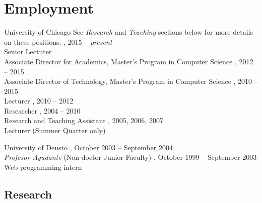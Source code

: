 \documentclass{resume}
\begin{document}
\section*{\hspace{-1cm}Employment}
\begin{category}{University of Chicago}
\citemnobullet{} See \emph{Research} and \emph{Teaching} sections below for more details on these positions.
, 2015 -- \emph{present}\\
Senior Lecturer\\
Associate Director for Academics, Master's Program in Computer Science
, 2012 -- 2015\\
Associate Director of Technology, Master's Program in Computer Science
, 2010 -- 2015\\
Lecturer
, 2010 -- 2012\\
Researcher
, 2004 -- 2010\\
Research and Teaching Assistant
, 2005, 2006, 2007\\
Lecturer (Summer Quarter only)
\end{category}
\begin{category}{University of Deusto}
, October 2003 -- September 2004\\
\emph{Profesor Ayudante} (Non-doctor Junior Faculty)
, October 1999 -- September 2003\\
Web programming intern
\end{category}

\pagebreak





\begin{center}
\section*{\huge Research}
\vspace{2ex}
\end{center}
\end{document}

